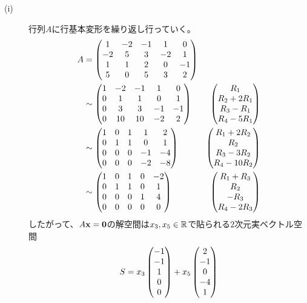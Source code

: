 \begin{sol} ${}$
  \begin{description}
    \item[(i)] 行列$A$に行基本変形を繰り返し行っていく。
    \begin{align*}
      A &= \begin{pmatrix} 
      1 & -2 & -1 & 1 & 0 \\
      -2 & 5 & 3 & -2 & 1 \\
      1& 1& 2 &0 &-1 \\
      5&  0&  5&  3&  2 \\
       \end{pmatrix} \\
      &\sim \begin{pmatrix} 
      1 & -2 & -1 & 1 & 0 \\
      0 & 1 & 1 & 0 & 1 \\
      0& 3& 3 &-1 &-1 \\
      0&  10&  10&  -2&  2 \\
       \end{pmatrix} & \begin{pmatrix}  R_1 \\ R_2+2R_1 \\ R_3-R_1 \\ R_4-5R_1 \end{pmatrix} \\
     &\sim \begin{pmatrix} 
      1 & 0 & 1 & 1 & 2 \\
      0 & 1 & 1 & 0 & 1 \\
      0& 0& 0 &-1 &-4 \\
      0&  0&  0&  -2&  -8 \\
       \end{pmatrix} & \begin{pmatrix}  R_1+2R_2 \\ R_2 \\ R_3-3R_2  \\ R_4 -10R_2 \end{pmatrix} \\
      &\sim \begin{pmatrix} 
        1 & 0 & 1 & 0 & -2 \\
        0 & 1 & 1 & 0 & 1 \\
        0& 0& 0 &1 &4 \\
        0&  0&  0&  0&  0 \\
         \end{pmatrix} & \begin{pmatrix} R_1+R_3 \\ R_2 \\ -R_3 \\ R_4-2R_3  \end{pmatrix}
    \end{align*}
    したがって、$A\textbf{x}=\textbf{0}$の解空間は$x_3,x_5 \in {\mathbb R}$で貼られる$2$次元実ベクトル空間
    \[
    S = x_3 \begin{pmatrix} -1 \\-1 \\1 \\0 \\0  \end{pmatrix} + x_5 \begin{pmatrix} 2\\ -1\\ 0\\ -4\\ 1 \end{pmatrix}
\]
\end{description}
\end{sol}
